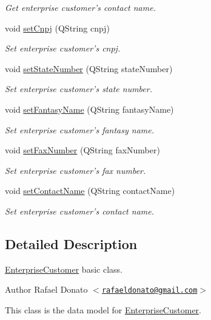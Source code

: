 \begin{DoxyCompactItemize}
\begin{DoxyCompactList}\small\item\em \-Get enterprise customer's contact name. \end{DoxyCompactList}\item 
void \hyperlink{class_enterprise_customer_a7baa196ddb009a9682f50f85a4b6d930}{set\-Cnpj} (\-Q\-String cnpj)
\begin{DoxyCompactList}\small\item\em \-Set enterprise customer's cnpj. \end{DoxyCompactList}\item 
void \hyperlink{class_enterprise_customer_a2edff1562ae9f18621504737f6fe10ba}{set\-State\-Number} (\-Q\-String state\-Number)
\begin{DoxyCompactList}\small\item\em \-Set enterprise customer's state number. \end{DoxyCompactList}\item 
void \hyperlink{class_enterprise_customer_ad4db6fe03dca096faf80a78c9c1f413d}{set\-Fantasy\-Name} (\-Q\-String fantasy\-Name)
\begin{DoxyCompactList}\small\item\em \-Set enterprise customer's fantasy name. \end{DoxyCompactList}\item 
void \hyperlink{class_enterprise_customer_af766da65733ff3deb4e97d34c4f816df}{set\-Fax\-Number} (\-Q\-String fax\-Number)
\begin{DoxyCompactList}\small\item\em \-Set enterprise customer's fax number. \end{DoxyCompactList}\item 
void \hyperlink{class_enterprise_customer_a90bc2ed44e44060c61a90eba569024e7}{set\-Contact\-Name} (\-Q\-String contact\-Name)
\begin{DoxyCompactList}\small\item\em \-Set enterprise customer's contact name. \end{DoxyCompactList}\end{DoxyCompactItemize}


\subsection{\-Detailed \-Description}
\hyperlink{class_enterprise_customer}{\-Enterprise\-Customer} basic class. 

\begin{DoxyAuthor}{\-Author}
\-Rafael \-Donato $<$\href{mailto:rafaeldonato@gmail.com}{\tt rafaeldonato@gmail.\-com}$>$
\end{DoxyAuthor}
\-This class is the data model for \hyperlink{class_enterprise_customer}{\-Enterprise\-Customer}. 

